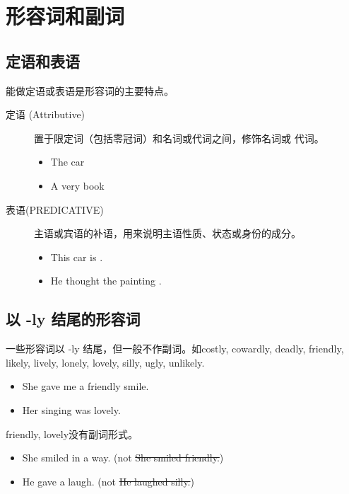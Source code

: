 \section{形容词和副词}

\subsection{定语和表语}

能做定语或表语是形容词的主要特点。

\begin{description}
\item[定语 (Attributive)] 置于限定词（包括零冠词）和名词或代词之间，修饰名词或
  代词。
  \begin{itemize}
  \item The  car
  \item A very  book
  \end{itemize}

\item[表语(PREDICATIVE)] 主语或宾语的补语，用来说明主语性质、状态或身份的成分。
  \begin{itemize}
  \item This car is .

  \item He thought the painting .
  \end{itemize}
\end{description}

\subsection{以 -ly 结尾的形容词}

一些形容词以 -ly 结尾，但一般不作副词。如costly, cowardly, deadly, friendly,
likely, lively, lonely, lovely, silly, ugly, unlikely.
\begin{itemize}
\item She gave me a friendly smile.

\item Her singing was lovely.
\end{itemize}

friendly, lovely没有副词形式。
\begin{itemize}
\item She smiled in a  way. (not \sout{She smiled friendly.})
\item He gave a  laugh. (not \sout{He laughed silly.})
\end{itemize}


